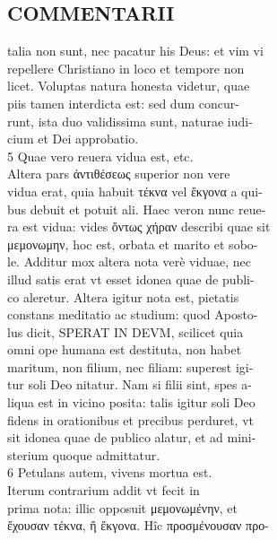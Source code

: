 \documentclass{article}
\begin{document}
\begin{pages}
\section*{COMMENTARII \\
                }
talia non sunt, nec pacatur his Deus: et vim vi \\
                repellere Christiano in loco et tempore non \\
                licet. Voluptas natura honesta videtur, quae \\
                piis tamen interdicta est: sed dum concur- \\
                runt, ista duo validissima sunt, naturae iudi- \\
                cium et Dei approbatio. \\
                5 Quae vero reuera vidua est, etc. \\
                Altera pars ἀντιθέσεως superior non vere \\
                vidua erat, quia habuit τέκνα vel ἔκγονα a qui- \\
                bus debuit et potuit ali. Haec veron nunc reue- \\
                ra est vidua: vides ὄντως χήραν describi quae sit \\
                μεμονωμην, hoc est, orbata et marito et sobo- \\
                le. Additur mox altera nota verè viduae, nec \\
                illud satis erat vt esset idonea quae de publi- \\
                co aleretur. Altera igitur nota est, pietatis \\
                constans meditatio ac studium: quod Aposto- \\
                lus dicit, SPERAT IN DEVM, scilicet quia \\
                omni ope humana est destituta, non habet \\
                maritum, non filium, nec filiam: superest igi- \\
                tur soli Deo nitatur. Nam si filii sint, spes a- \\
                liqua est in vicino posita: talis igitur soli Deo \\
                fidens in orationibus et precibus perduret, vt \\
                sit idonea quae de publico alatur, et ad mini- \\
                sterium quoque admittatur. \\
                6 Petulans autem, vivens mortua est. \\
                Iterum contrarium addit vt fecit in \\
                prima nota: illic opposuit μεμονωμένην, et \\
                ἔχουσαν τέκνα, ἤ ἔκγονα.  Hîc προσμένουσαν προ- \\
                

\end{pages}
\end{document}

